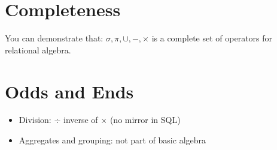 \documentclass{../cheatsheet}
\begin{document}
\begin{multicols*}{2}
    \section{Completeness}
    You can demonstrate that: $\sigma, \pi, \cup, -, \times$ is a complete set
    of operators for relational algebra.

    \section{Odds and Ends}
    \begin{itemize}
        \item Division: $\div$ \textapprox inverse of $\times$ (no mirror in
            SQL)
        \item Aggregates and grouping: not part of basic algebra
    \end{itemize}


\end{multicols*}
\end{document}
